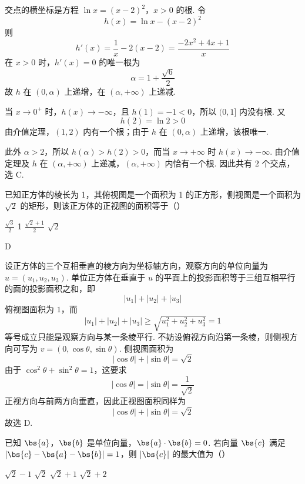 \begin{solution}
交点的横坐标是方程
\(\ln x=(x-2)^2\)，\(x>0\)
的根. 令
\[
h(x)=\ln x-(x-2)^2
\]
则
\[
h'(x)=\frac1x-2(x-2)=\frac{-2x^2+4x+1}{x}
\]
在 \(x>0\) 时，\(h'(x)=0\) 的唯一根为
\[
\alpha=1+\frac{\sqrt6}{2}
\]
故 \(h\) 在 \((0,\alpha)\) 上递增，在 \((\alpha,+\infty)\) 上递减.

当 \(x\to0^+\) 时，\(h(x)\to-\infty\)，且 \(h(1)=-1<0\)，所以 \((0,1]\) 内没有根. 又
\[
h(2)=\ln2>0
\]
由介值定理，\((1,2)\) 内有一个根；由于 \(h\) 在 \((0,\alpha)\) 上递增，该根唯一.

此外 \(\alpha>2\)，所以 \(h(\alpha)>h(2)>0\)，而当 \(x\to+\infty\) 时 \(h(x)\to-\infty\). 由介值定理及 \(h\) 在 \((\alpha,+\infty)\) 上递减，\((\alpha,+\infty)\) 内恰有一个根. 因此共有 \(2\) 个交点，选 C.
\end{solution}

\begin{problem}
已知正方体的棱长为 1，其俯视图是一个面积为 1 的正方形，侧视图是一个面积为 \(\sqrt{2}\) 的矩形，则该正方体的正视图的面积等于（\quad）

\choices
    {\(\frac{\sqrt{3}}{2}\)}
    {1}
    {\(\frac{\sqrt{2} + 1}{2}\)}
    {\(\sqrt{2}\)}
\end{problem}

\begin{answer}
D
\end{answer}

\begin{solution}
设正方体的三个互相垂直的棱方向为坐标轴方向，观察方向的单位向量为 \(u=\left(u_1,u_2,u_3\right)\). 单位正方体在垂直于 \(u\) 的平面上的投影面积等于三组互相平行的面的投影面积之和，即
\[
|u_1|+|u_2|+|u_3|
\]
俯视图面积为 \(1\)，而
\[
|u_1|+|u_2|+|u_3|\geqslant\sqrt{u_1^2+u_2^2+u_3^2}=1
\]
等号成立只能是观察方向与某一条棱平行. 不妨设俯视方向沿第一条棱，则侧视方向可写为 \(v=(0,\cos\theta,\sin\theta)\). 侧视图面积为
\[
|\cos\theta|+|\sin\theta|=\sqrt2
\]
由于 \(\cos^2\theta+\sin^2\theta=1\)，这要求
\[
|\cos\theta|=|\sin\theta|=\frac{1}{\sqrt2}
\]
正视方向与前两方向垂直，因此正视图面积同样为
\[
|\cos\theta|+|\sin\theta|=\sqrt2
\]
故选 D.
\end{solution}

\begin{problem}
已知 \(\bs{a}\)，\(\bs{b}\) 是单位向量，\(\bs{a} \cdot \bs{b} = 0\). 若向量 \(\bs{c}\) 满足 \(|\bs{c} - \bs{a} - \bs{b}| = 1\)，则 \(|\bs{c}|\) 的最大值为（\quad）

\choices
    {\(\sqrt{2} - 1\)}
    {\(\sqrt{2}\)}
    {\(\sqrt{2} + 1\)}
    {\(\sqrt{2} + 2\)}
\end{problem}

